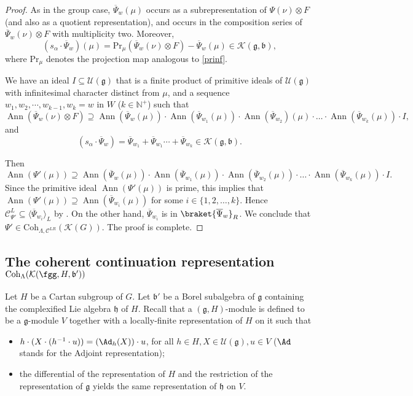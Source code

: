\documentclass[12pt]{amsart}
\def\subset{\subseteq}
\newcommand{\BN}{{\mathbb {N}}}
\newcommand{\CC}{{\mathcal {C}}}
\newcommand{\CK}{{\mathcal {K}}}
\newcommand{\CU}{{\mathcal {U}}}
\DeclareMathOperator{\Ann}{Ann}
\newcommand{\g}{\mathfrak g}
\newcommand{\h}{\mathfrak h}
\renewcommand{\b}{\mathfrak b}
\newcommand{\la}{\langle}
\newcommand{\ra}{\rangle}
\newcommand{\be}{\begin {equation}}
\newcommand{\ee}{\end {equation}}
\numberwithin{equation}{section}
\theoremstyle{remark}
\def\Coh{\mathrm{Coh}}
\def\bPsi{\overline{\Psi}}
\begin{document}
\begin{proof}
As in the group case,  $\bPsi_w(\mu)$ occurs as a subrepresentation of $\Psi(\nu)\otimes F$ (and also as a quotient representation), and occurs in
the composition series of $\bPsi_w(\nu)\otimes F$ with multiplicity two. Moreover,
\be\label{sap3}
 ( s_\alpha\cdot \bPsi_w)(\mu)=\mathrm{Pr}_\mu(\bPsi_w(\nu)\otimes F)-\bPsi_w(\mu)\in \CK(\g,\b),
\ee
where $\mathrm{Pr}_\mu$ denotes  the projection map analogous to \eqref{prinf}.

We have an ideal  $I\subset \CU(\g)$ that is a finite product of primitive ideals of $\CU(\g)$ with infinitesimal character distinct from $\mu$,
and a sequence $w_1, w_2, \cdots, w_{k-1}, w_k=w$ in $W$ ($k\in \BN^+$) such that
\[
\Ann(\bPsi_w(\nu)\otimes F)\supseteq \Ann (\bPsi_{w}(\mu))\cdot \Ann (\bPsi_{w_1}(\mu))\cdot \Ann (\bPsi_{w_2})(\mu)\cdot \dots \cdot  \Ann( \bPsi_{w_k}(\mu)) \cdot I,
\]
and
\[
  ( s_\alpha\cdot \bPsi_w)= \bPsi_{w_1}+\bPsi_{w_1} \cdots+ \bPsi_{w_k}\in \CK(\g,\b).
\]

Then
\[
  \Ann(\Psi'(\mu))\supseteq \Ann (\bPsi_{w}(\mu))\cdot \Ann (\bPsi_{w_1}(\mu))\cdot \Ann (\bPsi_{w_2}(\mu))\cdot \dots \cdot  \Ann (\bPsi_{w_k}(\mu))\cdot I.
\]
Since the primitive ideal $\Ann(\Psi'(\mu))$ is prime,
this  implies that $\Ann(\Psi'(\mu))\supseteq \Ann(\bPsi_{w_i}(\mu))$
for some $i\in \{1,2, \dots,k\}$. Hence $\CC^L_{\Psi'} \subset \la \bPsi_{w_i}\ra_L$ by .
On the other hand, $\bPsi_{w_i}$ is in $\braket{\bPsi_w}_{R}$.
We conclude that $\Psi'\in \Coh_{\Lambda, \CC^{LR}}(\CK(G))$. The proof is complete.
\end{proof}


\subsection{The coherent continuation representation $\Coh_\Lambda(\CK(\fgg,H, \b'))$}


  Let $H$ be a Cartan subgroup of $G$. Let $\b'$ be a Borel subalgebra of $\g$ containing the complexified Lie algebra $\h$ of $H$.  Recall that a $(\g, H)$-module is defined to be a $\g$-module $V$ together with a locally-finite representation of $H$ on it such that
     \begin{itemize}
     \item
        $h\cdot (X\cdot (h^{-1}\cdot u))=(\Ad_h(X))\cdot u$, for all $h\in H, X\in \CU(\g), u\in V$ ($\Ad$ stands for the Adjoint representation);
        \item the differential of the representation of $H$ and the restriction of the representation of $\g$ yields the same representation of $\h$ on $V$.
     \end{itemize}
\end{document}
